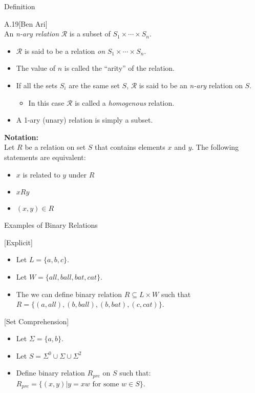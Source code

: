 \begin{slide}[bm=,toc=]{Definition}
\begin{defn}{A.19}[Ben Ari]~\\
An \emph{n-ary relation} $\mathcal{R}$ is a subset of $S_1 \times \cdots \times
S_n$. 
\begin{itemize}
\item<2-> $\mathcal{R}$ is said to be a relation \emph{on} $S_1 \times \cdots \times
S_n$.
\item<3-> The value of $n$ is called the ``arity'' of the relation.
\item<4-> If all the sets $S_i$ are the same set $S$, $\mathcal{R}$ is said to be
an \emph{n-ary} relation on $S$.
\begin{itemize}
\item<5-> In this case $\mathcal{R}$ is called a \emph{homogenous} relation.
\end{itemize}
\item<6-> A 1-ary (unary) relation is simply a subset.
\end{itemize}
\end{defn}
\vspace{-3mm}
\pause[6]
\textbf{Notation:}~\\
Let $R$ be a relation on set $S$ that contains elements $x$ and $y$. 
The following statements are equivalent: 
\begin{itemize}
\item<8-> $x$ is related to $y$ under $R$
\item<8-> $xRy$
\item<8-> $(x,y) \in R$
\end{itemize}
\end{slide}

\begin{slide}[bm=,toc=]{Examples of Binary Relations}
\begin{ex}{}[Explicit]~\\
\begin{itemize}
\item<2-> Let $L = \{a,b,c\}$.
\item<3-> Let $W = \{all,ball,bat,cat\}$.
\item<4-> The we can define binary relation $R \subseteq L \times W$ such that 
      $R = \{(a,all),(b,ball),(b, bat), (c,cat)\}$.
\end{itemize}
\end{ex}
\pause[4]
\begin{ex}{}[Set Comprehension]~\\
\begin{itemize}
\item<6-> Let $\Sigma = \{a,b\}$.
\item<7-> Let $S = \Sigma^0 \cup \Sigma \cup \Sigma^2$
\item<8-> Define binary relation $R_{pre}$ on $S$ such that:
      $R_{pre} = \{(x,y)| y = xw \text{ for some } w \in S \}$.
\end{itemize}
\end{ex}

\end{slide}

